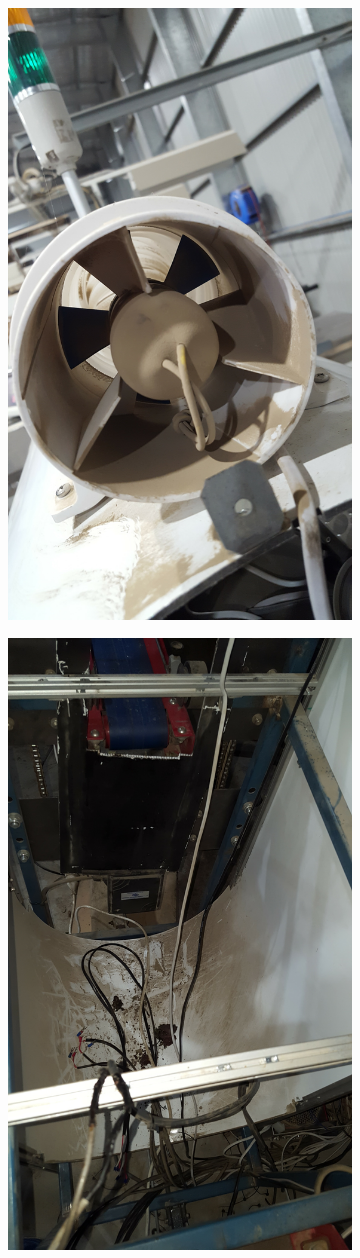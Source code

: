 \documentclass[fleqn,twoside,12pt]{report}
\begin{document}
\begin{figure}[ht]
	\centering
	\begin{subfigure}{.25\textwidth}
		\centering
		\includegraphics[height=0.9\linewidth,angle=270]{dirt_1.jpg}
		\caption{}
		\label{fig:dirt_1}
	\end{subfigure}%
	\begin{subfigure}{.25\textwidth}
		\centering
		\includegraphics[height=0.9\linewidth,angle=270]{dirt_2.jpg}

\end{subfigure}
\end{figure}
\end{document}
